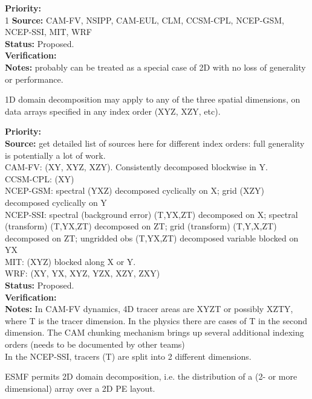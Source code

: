 \begin{reqlist}
{\bf Priority:} \\ 1
{\bf Source:} CAM-FV, NSIPP, CAM-EUL, CLM, CCSM-CPL, NCEP-GSM, NCEP-SSI, MIT, WRF \\
{\bf Status:} Proposed. \\
{\bf Verification:} \\
{\bf Notes:} probably can be treated as a special case of 2D with no
  loss of generality or performance.
\end{reqlist}


1D domain decomposition may apply to any of the three spatial
dimensions, on data arrays specified in any index order (XYZ, XZY,
etc).

\begin{reqlist}
{\bf Priority:} \\
{\bf Source:} get detailed list of sources here for different index
  orders: full generality is potentially a lot of work. \\
 CAM-FV: (XY, XYZ, XZY).  Consistently decomposed blockwise in Y. \\
 CCSM-CPL: (XY) \\
 NCEP-GSM: spectral (YXZ) decomposed cyclically on X;
           grid (XZY) decomposed cyclically on Y \\
 NCEP-SSI: spectral (background error) (T,YX,ZT) decomposed on X;
           spectral (transform) (T,YX,ZT) decomposed on ZT;
           grid (transform) (T,Y,X,ZT) decomposed on ZT;
           ungridded obs (T,YX,ZT) decomposed variable blocked on YX \\
 MIT: (XYZ) blocked along X or Y. \\
 WRF: (XY, YX, XYZ, YZX, XZY, ZXY) \\
{\bf Status:} Proposed. \\
{\bf Verification:} \\
{\bf Notes:}  In CAM-FV dynamics, 4D tracer areas are XYZT or
	possibly XZTY, where T is the tracer dimension.  In the physics
	there are cases of T in the second dimension.  The CAM
	chunking mechanism brings up several additional indexing
	orders (needs to be documented by other teams) \\
        In the NCEP-SSI, tracers (T) are split into 2 different dimensions. 
\end{reqlist}


ESMF permits 2D domain decomposition, i.e. the distribution of a
(2- or more dimensional) array over a 2D PE layout.

